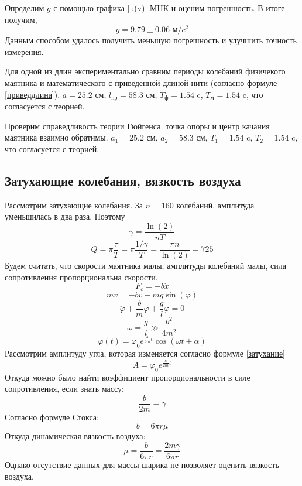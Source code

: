 \documentclass[a4paper,12pt]{article} %
\begin{document}
Определим $g$ с помощью графика \ref{u(v)} МНК и оценим погрешность. В итоге получим, \[g=9.79 \pm 0.06 \text{ м/}c^2\]
Данным способом удалось получить меньшую погрешность и улучшить точность измерения.

Для одной из длин экспериментально сравним периоды колебаний физичекого маятника и математического с приведенной длиной нити (согласно формуле \ref{приведдлина}). 
$a= 25.2 $ см, $l_\text{пр}= 58.3$ см, $T_\text{ф}=1.54$ c, $T_\text{м}=1.54$ c, что согласуется с теорией.

Проверим справедливость теории Гюйгенса: точка опоры и центр качания маятника взаимно обратимы. 
$a_1= 25.2 $ см, $a_2= 58.3$ см, $T_1=1.54$ c, $T_2=1.54$ c, что согласуется с теорией.

\subsection{Затухающие колебания, вязкость воздуха}
Рассмотрим затухающие колебания. За $n=160$ колебаний, амплитуда уменьшилась в два раза. Поэтому
\[\gamma = \frac{\ln(2)}{nT}\]
\[Q=\pi\frac{\tau}{T}=\pi\frac{1/\gamma}{T}=\frac{\pi n}{\ln(2)}=725\]
Будем считать, что скорости маятника малы, амплитуды колебаний малы, сила сопротивления пропорциональна скорости.
\begin{equation}
F_c=-b\dot{x}
\end{equation}
\begin{equation}
m\dot{v}=-bv-mg\sin(\varphi)
\end{equation}
\begin{equation}
\ddot{\varphi}+\frac{b}{m}\dot{\varphi}+\frac{g}{l}\varphi=0
\end{equation}
\begin{equation}
\omega=\frac{g}{l}\gg \frac{b^2}{4m^2}
\end{equation}
\begin{equation}
\varphi(t)=\varphi_0e^{\frac{b}{2m}t}\cos(\omega t+\alpha)
\end{equation}
Рассмотрим амплитуду угла, которая изменяется согласно формуле \ref{затухание}
\begin{equation}
A=\varphi_0e^{\frac{b}{2m}t}
\end{equation}
Откуда можно было найти коэффициент пропорциональности в силе сопротивления, если знать массу:
\begin{equation}
\frac{b}{2m}=\gamma
\end{equation}
Согласно формуле Стокса:
\begin{equation}
b=6\pi r\mu
\end{equation}
Откуда динамическая вязкость воздуха:
\begin{equation}
\mu=\frac{b}{6\pi r}=\frac{2m\gamma}{6\pi r}
\end{equation}
Однако отсутствие данных для массы шарика не позволяет оценить вязкость воздуха.
\end{document}
